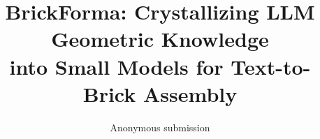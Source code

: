 \title{BrickForma: Crystallizing LLM Geometric Knowledge\\into Small Models for Text-to-Brick Assembly}
\author{Anonymous submission}
\affiliations{}
